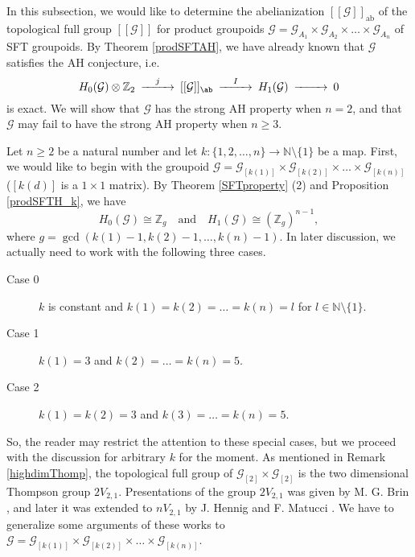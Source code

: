 \documentclass[11pt]{article}
\theoremstyle{definition}
\numberwithin{equation}{section}
\newcommand{\ab}{\mathrm{ab}}
\newcommand{\G}{\mathcal{G}}
\newcommand{\N}{\mathbb{N}}
\newcommand{\Z}{\mathbb{Z}}
\begin{document}
In this subsection, 
we would like to determine the abelianization $[[\G]]_\ab$ 
of the topological full group $[[\G]]$ 
for product groupoids $\G=\G_{A_1}\times\G_{A_2}\times\dots\times\G_{A_n}$ 
of SFT groupoids. 
By Theorem \ref{prodSFTAH}, we have already known that 
$\G$ satisfies the AH conjecture, i.e. 
\[
\begin{CD}
H_0(\G)\otimes\Z_2@>j>>[[\G]]_\ab@>I>>H_1(\G)@>>>0
\end{CD}
\]
is exact. 
We will show that $\G$ has the strong AH property when $n=2$, 
and that $\G$ may fail to have the strong AH property when $n\geq3$. 

Let $n\geq2$ be a natural number and 
let $k:\{1,2,\dots,n\}\to\N\setminus\{1\}$ be a map. 
First, we would like to begin with the groupoid 
$\G=\G_{[k(1)]}\times\G_{[k(2)]}\times\dots\times\G_{[k(n)]}$ 
($[k(d)]$ is a $1\times1$ matrix). 
By Theorem \ref{SFTproperty} (2) and Proposition \ref{prodSFTH_k}, we have 
\[
H_0(\G)\cong\Z_g\quad\text{and}\quad H_1(\G)\cong(\Z_g)^{n-1}, 
\]
where $g=\gcd(k(1){-}1,k(2){-}1,\dots,k(n){-}1)$. 
In later discussion, we actually need to work with the following three cases. 
\begin{description}
\item[Case 0]$k$ is constant and $k(1)=k(2)=\dots=k(n)=l$ 
for $l\in\N\setminus\{1\}$. 
\item[Case 1]$k(1)=3$ and $k(2)=\dots=k(n)=5$. 
\item[Case 2]$k(1)=k(2)=3$ and $k(3)=\dots=k(n)=5$. 
\end{description}
So, the reader may restrict the attention to these special cases, 
but we proceed with the discussion for arbitrary $k$ for the moment. 
As mentioned in Remark \ref{highdimThomp}, 
the topological full group of $\G_{[2]}\times\G_{[2]}$ is 
the two dimensional Thompson group $2V_{2,1}$. 
Presentations of the group $2V_{2,1}$ was given 
by M. G. Brin \cite{Brin05JAlg}, 
and later it was extended to $nV_{2,1}$ 
by J. Hennig and F. Matucci \cite{HM12PJM}. 
We have to generalize some arguments of these works 
to $\G=\G_{[k(1)]}\times\G_{[k(2)]}\times\dots\times\G_{[k(n)]}$. 
\end{document}
